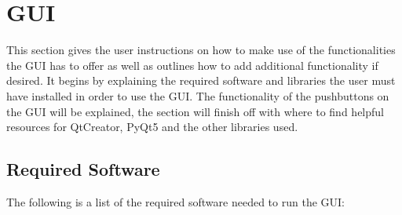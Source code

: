 \section{GUI}
This section gives the user instructions on how to make use of the functionalities the GUI has to offer as well as outlines how to add additional functionality if desired. It begins by explaining the required software and libraries the user must have installed in order to use the GUI. The functionality of the pushbuttons on the GUI will be explained, the section will finish off with where to find helpful resources for QtCreator, PyQt5 and the other libraries used.

\subsection{Required Software}
The following is a list of the required software needed to run the GUI:

